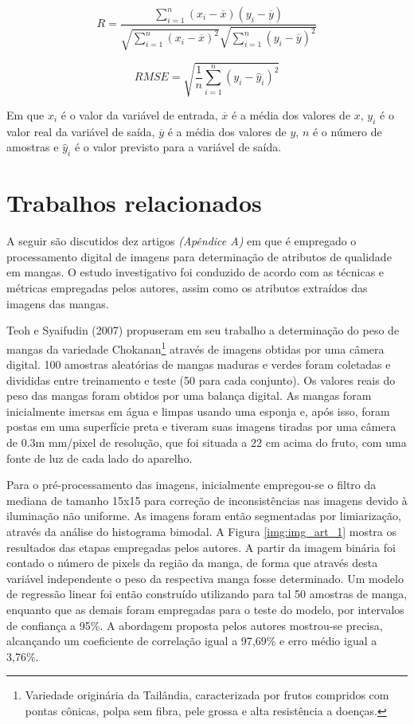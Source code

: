 \begin{equation} \label{eq:r}
	R = \frac{\sum_{i=1}^n (x_i - \overline{x})(y_i - \overline{y})}{\sqrt{\sum_{i=1}^n(x_i - \overline{x})^2} \sqrt{\sum_{i=1}^n (y_i - \overline{y})^2}}
\end{equation}

\begin{equation} \label{eq:rmse}
	RMSE = \sqrt{\frac{1}{n} \sum_{i=1}^n (y_i - \hat{y}_i)^2}
\end{equation}

Em que $x_i$ é o valor da variável de entrada, $\overline{x}$ é a média dos valores de $x$, $y_i$ é o valor real da variável de saída, $\overline{y}$ é a média dos valores de $y$, $n$ é o número de amostras e $\hat{y}_i$ é o valor previsto para a variável de saída.

\section{Trabalhos relacionados}

A seguir são discutidos dez artigos \textit{(Apêndice A)} em que é empregado o processamento digital de imagens para determinação de atributos de qualidade em mangas. O estudo investigativo foi conduzido de acordo com as técnicas e métricas empregadas pelos autores, assim como os atributos extraídos das imagens das mangas. 

Teoh e Syaifudin (2007) propuseram em seu trabalho a determinação do peso de mangas da variedade Chokanan\footnote{\label{ftnote:chokanan}Variedade originária da Tailândia, caracterizada por frutos compridos com pontas cônicas, polpa sem fibra, pele grossa e alta resistência a doenças.} através de imagens obtidas por uma câmera digital. 100 amostras aleatórias de mangas maduras e verdes foram coletadas e divididas entre treinamento e teste (50 para cada conjunto). Os valores reais do peso das mangas foram obtidos por uma balança digital. As mangas foram inicialmente imersas em água e limpas usando uma esponja e, após isso, foram postas em uma superfície preta e tiveram suas imagens tiradas por uma câmera de 0.3m mm/pixel de resolução, que foi situada a 22 cm acima do fruto, com uma fonte de luz de cada lado do aparelho. 

Para o pré-processamento das imagens, inicialmente empregou-se o filtro da mediana de tamanho 15x15 para correção de inconsistências nas imagens devido à iluminação não uniforme. As imagens foram então segmentadas por limiarização, através da análise do histograma bimodal. A Figura \ref{img:img_art_1} mostra os resultados das etapas empregadas pelos autores. A partir da imagem binária foi contado o número de pixels da região da manga, de forma que através desta variável independente o peso da respectiva manga fosse determinado. Um modelo de regressão linear foi então construído utilizando para tal 50 amostras de manga, enquanto que as demais foram empregadas para o teste do modelo, por intervalos de confiança a 95\%. A abordagem proposta pelos autores mostrou-se precisa, alcançando um coeficiente de correlação igual a 97,69\% e erro médio igual a 3,76\%. 

